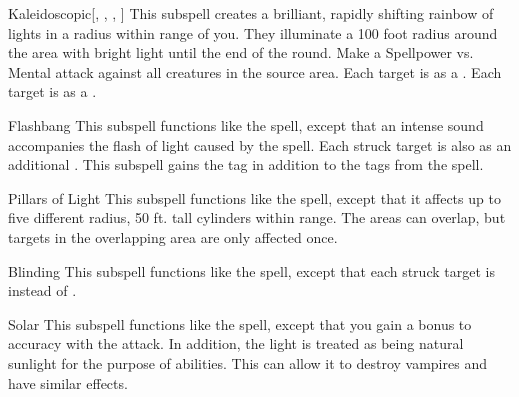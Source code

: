 \begin{ability}[\nth{3}]{Kaleidoscopic}[, , , ]
This subspell creates a brilliant, rapidly shifting rainbow of lights in a \areasmall radius within \rngmed range of you.
They illuminate a 100 foot radius around the area with bright light until the end of the round.
Make a Spellpower vs. Mental attack against all creatures in the source area.
\hit Each target is \disoriented as a .
\crit Each target is \confused as a .
\end{ability}
\vspace{0.25em}


\begin{ability}[\nth{4}]{Flashbang}
This subspell functions like the  spell, except that an intense sound accompanies the flash of light caused by the spell.
Each struck target is also  as an additional .
This subspell gains the  tag in addition to the tags from the  spell.
\end{ability}
\vspace{0.25em}


\begin{ability}[\nth{4}]{Pillars of Light}
This subspell functions like the  spell, except that it affects up to five different \areasmall radius, 50 ft. tall cylinders within range.
The areas can overlap, but targets in the overlapping area are only affected once.
\end{ability}
\vspace{0.25em}


\begin{ability}[\nth{5}]{Blinding}
This subspell functions like the  spell, except that each struck target is  instead of .
\end{ability}
\vspace{0.25em}


\begin{ability}[\nth{6}]{Solar}
This subspell functions like the  spell, except that you gain a  bonus to accuracy with the attack.
In addition, the light is treated as being natural sunlight for the purpose of abilities.
This can allow it to destroy vampires and have similar effects.
\end{ability}
\vspace{0.25em}

